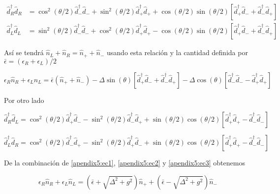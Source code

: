 \begin{appendixs}
\begin{align*}
    \hat{d}^{\dagger}_{R}\hat{d}_{R} & = \cos^{2}(\theta/2) \hat{d}^{\dagger}_{-}\hat{d}_{-} + \sin^{2}(\theta/2) \hat{d}^{\dagger}_{+}\hat{d}_{+} + \cos(\theta/2)\sin(\theta/2)[\hat{d}^{\dagger}_{+}\hat{d}_{-} + \hat{d}^{\dagger}_{-}\hat{d}_{+} ] \\
    \hat{d}^{\dagger}_{L}\hat{d}_{L} & = \sin^{2}(\theta/2) \hat{d}^{\dagger}_{-}\hat{d}_{-} + \cos^{2}(\theta/2) \hat{d}^{\dagger}_{+}\hat{d}_{+} - \cos(\theta/2)\sin(\theta/2)[\hat{d}^{\dagger}_{+}\hat{d}_{-} + \hat{d}^{\dagger}_{-}\hat{d}_{+} ]
\end{align*}

Así se tendrá $\hat{n}_{L} + \hat{n}_{R} = \hat{n}_{+} + \hat{n}_{-}$ usando esta relación y la cantidad definida por $\bar{\epsilon} = (\epsilon_{R} + \epsilon_{L})/2$ 

\begin{equation}
    \epsilon_{R} \hat{n}_{R} + \epsilon_{L} \hat{n}_{L}  = \bar{\epsilon}( \hat{n}_{+} + \hat{n}_{-} ) - \Delta \sin(\theta) [\hat{d}^{\dagger}_{+}\hat{d}_{-} + \hat{d}^{\dagger}_{-}\hat{d}_{+}] - \Delta \cos(\theta) [\hat{d}^{\dagger}_{-}\hat{d}_{-} - \hat{d}^{\dagger}_{+}\hat{d}_{+}]
\label{apendix5:ec1}
\end{equation}

Por otro lado 

\begin{equation}
    \hat{d}^{\dagger}_{R}\hat{d}_{L} = \cos^{2}(\theta/2)\hat{d}^{\dagger}_{+}\hat{d}_{-} - \sin^{2}(\theta/2) \hat{d}^{\dagger}_{-}\hat{d}_{+}  + \sin(\theta/2)\cos(\theta/2)[ \hat{d}^{\dagger}_{+}\hat{d}_{+} - \hat{d}^{\dagger}_{-}\hat{d}_{-} ]
    \label{apendix5:ec2}
\end{equation}

\begin{equation}
    \hat{d}^{\dagger}_{L}\hat{d}_{R} = \cos^{2}(\theta/2)\hat{d}^{\dagger}_{-}\hat{d}_{+} - \sin^{2}(\theta/2) \hat{d}^{\dagger}_{+}\hat{d}_{-}  + \sin(\theta/2)\cos(\theta/2)[ \hat{d}^{\dagger}_{+}\hat{d}_{+} - \hat{d}^{\dagger}_{-}\hat{d}_{-} ]
    \label{apendix5:ec3}
\end{equation}

De la combinación de \ref{apendix5:ec1}, \ref{apendix5:ec2} y \ref{apendix5:ec3} obtenemos

\begin{equation*}
    \epsilon_{R} \hat{n}_{R} + \epsilon_{L} \hat{n}_{L} = (\bar{\epsilon} + \sqrt{\Delta^{2} + g^{2}})\hat{n}_{+} +  (\bar{\epsilon} - \sqrt{\Delta^{2} + g^{2}})\hat{n}_{-}
\end{equation*}


\end{appendixs}
